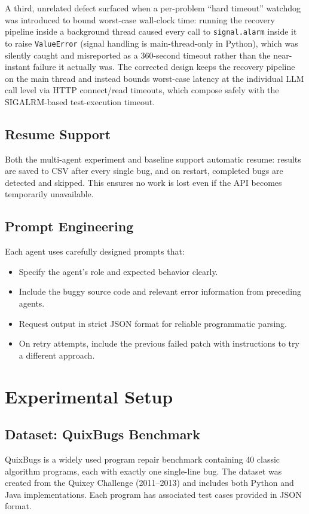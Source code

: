 \documentclass[conference]{IEEEtran}
\begin{document}
A third, unrelated defect surfaced when a per-problem ``hard timeout'' watchdog was introduced to bound worst-case wall-clock time: running the recovery pipeline inside a background thread caused every call to \texttt{signal.alarm} inside it to raise \texttt{ValueError} (signal handling is main-thread-only in Python), which was silently caught and misreported as a 360-second timeout rather than the near-instant failure it actually was. The corrected design keeps the recovery pipeline on the main thread and instead bounds worst-case latency at the individual LLM call level via HTTP connect/read timeouts, which compose safely with the SIGALRM-based test-execution timeout.

\subsection{Resume Support}
Both the multi-agent experiment and baseline support automatic resume: results are saved to CSV after every single bug, and on restart, completed bugs are detected and skipped. This ensures no work is lost even if the API becomes temporarily unavailable.

\subsection{Prompt Engineering}
Each agent uses carefully designed prompts that:
\begin{itemize}
    \item Specify the agent's role and expected behavior clearly.
    \item Include the buggy source code and relevant error information from preceding agents.
    \item Request output in strict JSON format for reliable programmatic parsing.
    \item On retry attempts, include the previous failed patch with instructions to try a different approach.
\end{itemize}

\section{Experimental Setup}

\subsection{Dataset: QuixBugs Benchmark}
QuixBugs \cite{quixbugs} is a widely used program repair benchmark containing 40 classic algorithm programs, each with exactly one single-line bug. The dataset was created from the Quixey Challenge (2011--2013) and includes both Python and Java implementations. Each program has associated test cases provided in JSON format.
\end{document}
